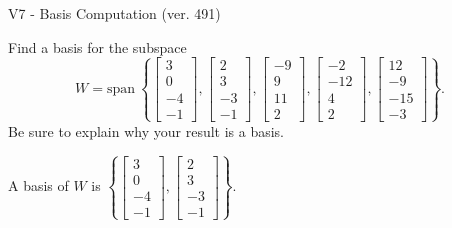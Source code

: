 \begin{exercise}
  \begin{exerciseTitle}V7 - Basis Computation (ver. 491)\end{exerciseTitle}
  \begin{exerciseStatement}
    Find a basis for the subspace 
\[W=\mathrm{span}\ \left\{\left[\begin{array}{r}
3 \\
0 \\
-4 \\
-1
\end{array}\right] , \left[\begin{array}{r}
2 \\
3 \\
-3 \\
-1
\end{array}\right] , \left[\begin{array}{r}
-9 \\
9 \\
11 \\
2
\end{array}\right] , \left[\begin{array}{r}
-2 \\
-12 \\
4 \\
2
\end{array}\right] , \left[\begin{array}{r}
12 \\
-9 \\
-15 \\
-3
\end{array}\right]\right\}.\]
 Be sure to explain why your result is a basis.


  \end{exerciseStatement}
  \begin{exerciseAnswer}
   A basis of \(W\) is  \(\left\{\left[\begin{array}{r}
3 \\
0 \\
-4 \\
-1
\end{array}\right] , \left[\begin{array}{r}
2 \\
3 \\
-3 \\
-1
\end{array}\right]\right\}\).
  


  \end{exerciseAnswer}
\end{exercise}